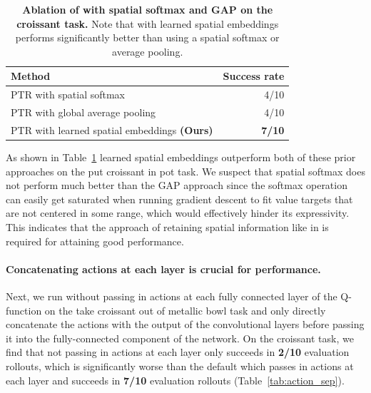 \documentclass[../thesis.tex]{subfiles}
\begin{document}
\begin{table}[h]
\centering
\begin{tabular}{l|r}
\toprule
\textbf{Method} & \textbf{Success rate}\\  \midrule
PTR with spatial softmax & 4/10 \\
PTR with global average pooling & 4/10 \\
\midrule
PTR with learned spatial embeddings \textbf{(Ours)} & \textbf{7/10} \\
\bottomrule
\end{tabular}
\vspace{0.1cm}
\caption{\footnotesize{\textbf{Ablation of \ptrmethodname with spatial softmax and GAP on the croissant task.} Note that \ptrmethodname with learned spatial embeddings performs significantly better than using a spatial softmax or average pooling.}}
\label{tab:spatial}
\end{table}

As shown in {Table~\ref{tab:spatial}} learned spatial embeddings outperform both of these prior approaches on the put croissant in pot task. We suspect that spatial softmax does not perform much better than the GAP approach since the softmax operation can easily get saturated when running gradient descent to fit value targets that are not centered in some range, which would effectively hinder its expressivity. This indicates that the approach of retaining spatial information like in \ptrmethodname is required for attaining good performance.

\paragraph{Concatenating actions at each layer is crucial for performance.} Next, we run \ptrmethodname without passing in actions at each fully connected layer of the Q-function on the take croissant out of metallic bowl task and only directly concatenate the actions with the output of the convolutional layers before passing it into the fully-connected component of the network. On the croissant task, we find that not passing in actions at each layer only succeeds in \textbf{2/10} evaluation rollouts, which is significantly worse than the default \ptrmethodname which passes in actions at each layer and succeeds in \textbf{7/10} evaluation rollouts (Table~\ref{tab:action_sep}).
\end{document}
